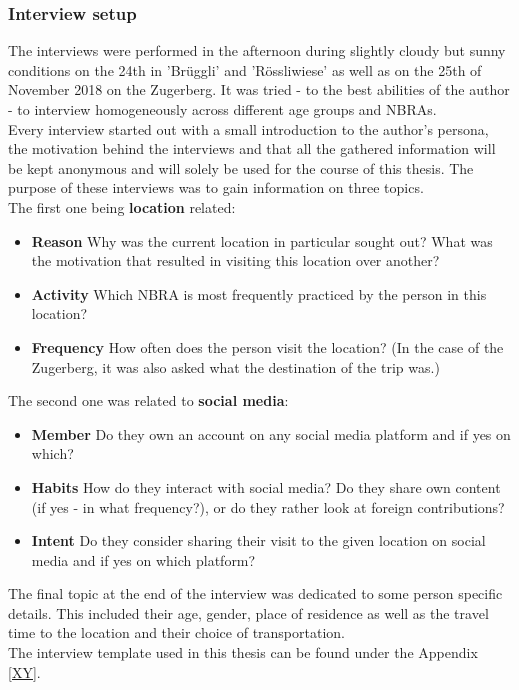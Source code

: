\subsubsection{Interview setup} \label{interview_setup}
The interviews were performed in the afternoon during slightly cloudy but sunny conditions on the 24th in 'Br\"uggli' and 'R\"ossliwiese' as well as on the 25th of November 2018 on the Zugerberg. It was tried - to the best abilities of the author - to interview homogeneously across different age groups and NBRAs.\\
Every interview started out with a small introduction to the author's persona, the motivation behind the interviews and that all the gathered information will be kept anonymous and will solely be used for the course of this thesis. The purpose of these interviews was to gain information on three topics.\\
\newline
The first one being \textbf{location} related:
\begin{itemize}
    \item \textbf{Reason} Why was the current location in particular sought out? What was the motivation that resulted in visiting this location over another?
    \item \textbf{Activity} Which NBRA is most frequently practiced by the person in this location?
    \item \textbf{Frequency} How often does the person visit the location? (In the case of the Zugerberg, it was also asked what the destination of the trip was.)
\end{itemize}
\newline
The second one was related to \textbf{social media}:
\begin{itemize}
    \item \textbf{Member} Do they own an account on any social media platform and if yes on which?
    \item \textbf{Habits} How do they interact with social media? Do they share own content (if yes - in what frequency?), or do they rather look at foreign contributions?
    \item \textbf{Intent} Do they consider sharing their visit to the given location on social media and if yes on which platform?
\end{itemize}
The final topic at the end of the interview was dedicated to some person specific details. This included their age, gender, place of residence as well as the travel time to the location and their choice of transportation.\\
The interview template used in this thesis can be found under the Appendix \ref{XY}.

















